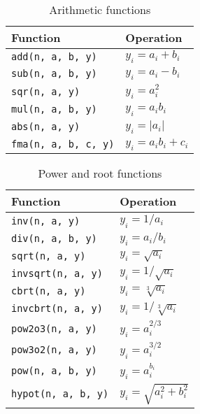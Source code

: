 \begin{table}
  \begin{tabularx}{\textwidth}{XX}
    \toprule
    Function & Operation \\
    \midrule
    \verb|add(n, a, b, y)|    & $y_i = a_i + b_i$     \\
    \verb|sub(n, a, b, y)|    & $y_i = a_i - b_i$     \\
    \verb|sqr(n, a, y)|       & $y_i = a_i^2$         \\
    \verb|mul(n, a, b, y)|    & $y_i = a_i b_i$       \\
    \verb|abs(n, a, y)|       & $y_i = |a_i|$         \\
    \verb|fma(n, a, b, c, y)| & $y_i = a_i b_i + c_i$ \\
    \bottomrule
  \end{tabularx}
  \caption{Arithmetic functions}
  \label{tab:Arithmetic functions}
\end{table}

\begin{table}
  \begin{tabularx}{\textwidth}{XX}
    \toprule
    Function & Operation \\
    \midrule
    \verb|inv(n, a, y)|      & $y_i = 1 / a_i$              \\
    \verb|div(n, a, b, y)|   & $y_i = a_i / b_i$            \\
    \verb|sqrt(n, a, y)|     & $y_i = \sqrt{a_i}$           \\
    \verb|invsqrt(n, a, y)|  & $y_i = 1 / \sqrt{a_i}$       \\
    \verb|cbrt(n, a, y)|     & $y_i = \sqrt[3]{a_i}$        \\
    \verb|invcbrt(n, a, y)|  & $y_i = 1 / \sqrt[3]{a_i}$    \\
    \verb|pow2o3(n, a, y)|   & $y_i = a_i^{2/3}$            \\
    \verb|pow3o2(n, a, y)|   & $y_i = a_i^{3/2}$            \\
    \verb|pow(n, a, b, y)|   & $y_i = a_i^{b_i}$            \\
    \verb|hypot(n, a, b, y)| & $y_i = \sqrt{a_i^2 + b_i^2}$ \\
    \bottomrule
  \end{tabularx}
  \caption{Power and root functions}
  \label{tab:Power and root functions}
\end{table}

